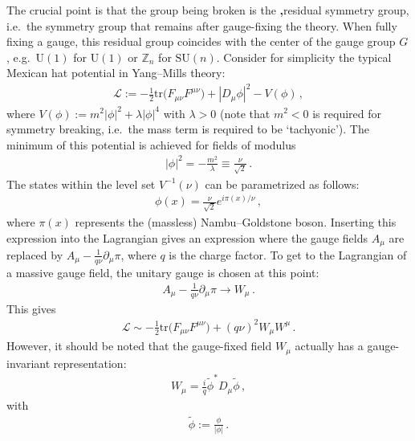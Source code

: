     The crucial point is that the group being broken is the \textbf,{residual symmetry group}, i.e.~the symmetry group that remains after gauge-fixing the theory. When fully fixing a gauge, this residual group coincides with the center of the gauge group $G$, e.g.~$\mathrm{U}(1)$ for $\mathrm{U}(1)$ or $\mathbb{Z}_n$ for $\mathrm{SU}(n)$. Consider for simplicity the typical Mexican hat potential in Yang--Mills theory:
    \begin{gather}
        \mathcal{L} := -\frac{1}{2}\mathrm{tr}\bigl(F_{\mu\nu}F^{\mu\nu}\bigr)+|D_\mu\phi|^2 - V(\phi)\,,
    \end{gather}
    where $V(\phi):=m^2|\phi|^2+\lambda|\phi|^4$ with $\lambda>0$ (note that $m^2<0$ is required for symmetry breaking, i.e.~the mass term is required to be `tachyonic'). The minimum of this potential is achieved for fields of modulus
    \begin{gather}
        |\phi|^2 = -\frac{m^2}{\lambda} \equiv \frac{\nu}{\sqrt{2}}\,.
    \end{gather}
    The states within the level set $V^{-1}(\nu)$ can be parametrized as follows:
    \begin{gather}
        \phi(x) = \frac{\nu}{\sqrt{2}}e^{i\pi(x)/\nu}\,,
    \end{gather}
    where $\pi(x)$ represents the (massless) Nambu--Goldstone boson. Inserting this expression into the Lagrangian gives an expression where the gauge fields $A_\mu$ are replaced by $A_\mu-\frac{1}{q\nu}\partial_\mu\pi$, where $q$ is the charge factor. To get to the Lagrangian of a massive gauge field, the unitary gauge is chosen at this point:
    \begin{gather}
        A_\mu-\frac{1}{q\nu}\partial_\mu\pi\longrightarrow W_\mu\,.
    \end{gather}
    This gives
    \begin{gather}
        \mathcal{L}\sim -\frac{1}{2}\mathrm{tr}\bigl(F_{\mu\nu}F^{\mu\nu}\bigr)+(q\nu)^2W_\mu W^\mu\,.
    \end{gather}
    However, it should be noted that the gauge-fixed field $W_\mu$ actually has a gauge-invariant representation:
    \begin{gather}
        W_\mu = \frac{i}{q}\widetilde{\phi}^*D_\mu\widetilde{\phi}\,,
    \end{gather}
    with
    \begin{gather}
        \widetilde{\phi} := \frac{\phi}{|\phi|}\,.
    \end{gather}

